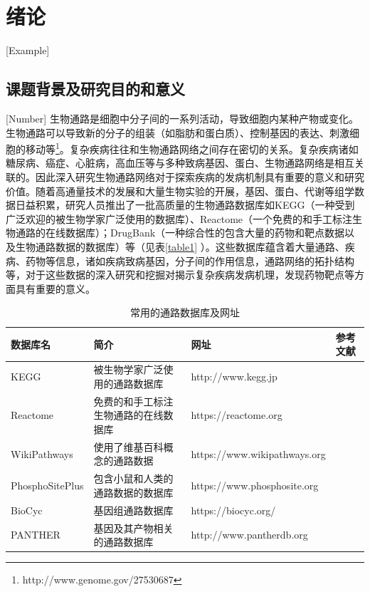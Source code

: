 \chapter{绪论}[Example]

\section{课题背景及研究目的和意义}[Number]
生物通路是细胞中分子间的一系列活动，导致细胞内某种产物或变化。生物通路可以导致新的分子的组装（如脂肪和蛋白质）、控制基因的表达、刺激细胞的移动等\footnote{http://www.genome.gov/27530687}。复杂疾病往往和生物通路网络之间存在密切的关系。复杂疾病诸如糖尿病、癌症、心脏病，高血压等与多种致病基因、蛋白、生物通路网络是相互关联的\cite{jin2011systematic}。因此深入研究生物通路网络对于探索疾病的发病机制具有重要的意义和研究价值。随着高通量技术的发展和大量生物实验的开展，基因、蛋白、代谢等组学数据日益积累，研究人员推出了一批高质量的生物通路数据库如KEGG\cite{kanehisa2008kegg}（一种受到广泛欢迎的被生物学家广泛使用的数据库）、Reactome\cite{croft2013reactome}（一个免费的和手工标注生物通路的在线数据库）；DrugBank\cite{wishart2006drugbank}（一种综合性的包含大量的药物和靶点数据以及生物通路数据的数据库）等（见表\ref{table1} ）。这些数据库蕴含着大量通路、疾病、药物等信息，诸如疾病致病基因，分子间的作用信息，通路网络的拓扑结构等，对于这些数据的深入研究和挖掘对揭示复杂疾病发病机理，发现药物靶点等方面具有重要的意义。

\begin{table}[htbp]
  \centering
	\caption[table1]{常用的通路数据库及网址}
\vspace{0.5em}\wuhao
\begin{tabularx}{1.0\textwidth}{lXXl}
\toprule[1.5pt]
数据库名 & 简介 & 网址 & 参考文献\\
\midrule[1pt]
KEGG & 被生物学家广泛使用的通路数据库 & http://www.kegg.jp & \cite{kanehisa2008kegg} \\
Reactome	& 免费的和手工标注生物通路的在线数据库	& https://reactome.org & \cite{croft2013reactome} \\
WikiPathways	& 使用了维基百科概念的通路数据	& https://www.wikipathways.org & \cite{pico2008wikipathways} \\
PhosphoSitePlus	& 包含小鼠和人类的通路数据的数据库 & https://www.phosphosite.org &	\cite{hornbeck2011phosphositeplus} \\
BioCyc 	& 基因组通路数据库& https://biocyc.org/	& \cite{krummenacker2005querying} \\
PANTHER	& 基因及其产物相关的通路数据库&http://www.pantherdb.org	& \cite{mi2016panther} \\
\bottomrule[1.5pt]
\end{tabularx}
\end{table}

